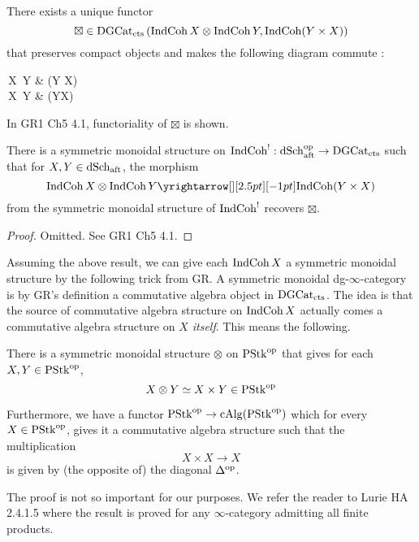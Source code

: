 \documentclass[./main.tex]{subfiles}
\begin{document}
\begin{prop}[GR1 Ch4 6.3.2]

  There exists a unique functor
  \[
    \boxtimes \in \mathrm{DGCat}_{\mathrm{cts}}\left(
      \mathrm{IndCoh}\,X \otimes \mathrm{IndCoh}\,Y , \mathrm{IndCoh}(Y \times X)
    \right)
  \]
  that preserves compact objects and makes the following diagram commute : 
  \begin{cd}
    {\INDCOH\,X \otimes \INDCOH\,Y} & {\INDCOH(Y \times X)} \\
    {\QCOH\,X \otimes \QCOH\,Y} & {\QCOH(Y\times X)}
    \arrow["{\Psi_X \otimes \Psi_Y}"', from=1-1, to=2-1]
    \arrow["\boxtimes"', from=2-1, to=2-2]
    \arrow["{\Psi_{Y \times X}}", from=1-2, to=2-2]
    \arrow["\boxtimes", from=1-1, to=1-2]
  \end{cd}
\end{prop}

In GR1 Ch5 4.1, functoriality of $\boxtimes$ is shown.
\begin{prop}
 
  There is a symmetric monoidal structure on 
  $\mathrm{IndCoh}^! : \mathrm{dSch}_{\mathrm{aft}}^{\mathrm{op}} \to \mathrm{DGCat}_{\mathrm{cts}}$ 
  such that for $X , Y \in \mathrm{dSch}_{\mathrm{aft}}$,
  the morphism \[
    \INDCOH\,X \otimes \INDCOH\,Y \map{}{} \INDCOH(Y \times X)
  \]
  from the symmetric monoidal structure of $\mathrm{IndCoh}^!$
  recovers $\boxtimes$. 
\end{prop}
\begin{proof}
  Omitted. See GR1 Ch5 4.1.
\end{proof}

\begin{rmk}
  
  Assuming the above result,
  we can give each $\mathrm{IndCoh}\,X$ a symmetric monoidal structure
  by the following trick from GR.
  A symmetric monoidal dg-$\infty$-category is by GR's definition
  a commutative algebra object in $\mathrm{DGCat}_{\mathrm{cts}}$.
  The idea is that the source of commutative algebra structure on 
  $\mathrm{IndCoh}\,X$ actually comes a commutative algebra structure on
  \emph{$X$ itself}.
  This means the following.
  
\end{rmk}

\begin{lem}
  
  There is a symmetric monoidal structure $\otimes$ on $\mathrm{PStk}^{\mathrm{op}}$
  that gives for each $X , Y \in \mathrm{PStk}^{\mathrm{op}}$, \[
    X \otimes Y \simeq X \times Y \in \mathrm{PStk}^{\mathrm{op}}
  \]

  Furthermore, we have a functor
  $\mathrm{PStk}^{\mathrm{op}} \to \mathrm{cAlg}(\mathrm{PStk}^{\mathrm{op}})$
  which for every $X \in \mathrm{PStk}^{\mathrm{op}}$,
  gives it a commutative algebra structure such that
  the multiplication
  \[
    X \times X \to X  
  \]
  is given by (the opposite of) the diagonal $\Delta^{\mathrm{op}}$.
  \begin{proof1}
    The proof is not so important for our purposes.
    We refer the reader to Lurie HA 2.4.1.5
    where the result is proved for any $\infty$-category
    admitting all finite products.
  \end{proof1}
\end{lem}
\end{document}

